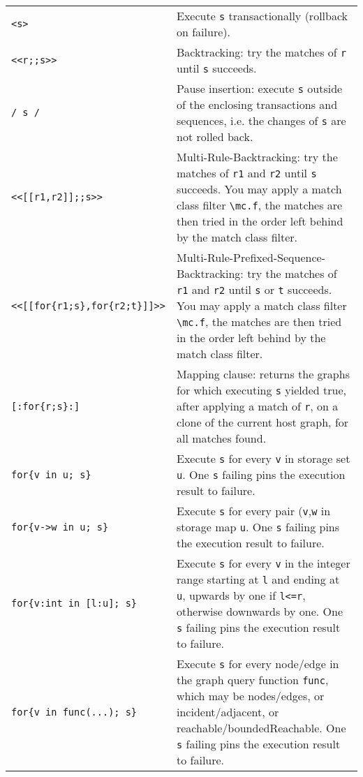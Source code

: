 \begin{table}[htbp]
\begin{minipage}{\linewidth} \renewcommand{\footnoterule}{} 
\begin{tabularx}{\linewidth}{|lX|}
\hline
\texttt{<s>} & Execute \texttt{s} transactionally (rollback on failure).\\
\texttt{<<r;;s>>} & Backtracking: try the matches of \texttt{r} until \texttt{s} succeeds.\\
\texttt{/ s /} & Pause insertion: execute \texttt{s} outside of the enclosing transactions and sequences, i.e. the changes of \texttt{s} are not rolled back.\\
\hline
\texttt{<<[[r1,r2]];;s>>} & Multi-Rule-Backtracking: try the matches of \texttt{r1} and \texttt{r2} until \texttt{s} succeeds. You may apply a match class filter \texttt{\textbackslash mc.f}, the matches are then tried in the order left behind by the match class filter.\\
\texttt{<<[[for\{r1;s\},for\{r2;t\}]]>>} & Multi-Rule-Prefixed-Sequence-Backtracking: try the matches of \texttt{r1} and \texttt{r2} until \texttt{s} or \texttt{t} succeeds. You may apply a match class filter \texttt{\textbackslash mc.f}, the matches are then tried in the order left behind by the match class filter.\\
\hline
\texttt{[:for\{r;s\}:]} & Mapping clause: returns the graphs for which executing \texttt{s} yielded true, after applying a match of \texttt{r}, on a clone of the current host graph, for all matches found.\\
\hline
\texttt{for\{v in u; s\}} & Execute \texttt{s} for every \texttt{v} in storage set \texttt{u}. One \texttt{s} failing pins the execution result to failure.\\
\texttt{for\{v->w in u; s\}} & Execute \texttt{s} for every pair (\texttt{v},\texttt{w} in storage map \texttt{u}. One \texttt{s} failing pins the execution result to failure.\\
\texttt{for\{v:int in [l:u]; s\}} & Execute \texttt{s} for every \texttt{v} in the integer range starting at \texttt{l} and ending at \texttt{u}, upwards by one if \texttt{l<=r}, otherwise downwards by one. One \texttt{s} failing pins the execution result to failure.\\
\texttt{for\{v in func(...); s\}} & Execute \texttt{s} for every node/edge in the graph query function \texttt{func}, which may be nodes/edges, or incident/adjacent, or reachable/boundedReachable. One \texttt{s} failing pins the execution result to failure.\\

\end{tabularx}
\end{minipage}
\end{table}
